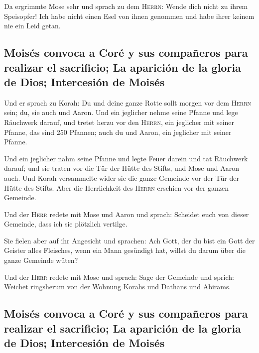  Da ergrimmte Mose sehr und sprach zu dem \textsc{Herrn}:
Wende dich nicht zu ihrem Speisopfer! Ich habe nicht einen Esel von
ihnen genommen und habe ihrer keinem nie ein Leid getan.

\hypertarget{moisuxe9s-convoca-a-coruxe9-y-sus-compauxf1eros-para-realizar-el-sacrificio-la-apariciuxf3n-de-la-gloria-de-dios-intercesiuxf3n-de-moisuxe9s}{%
\subsection{Moisés convoca a Coré y sus compañeros para realizar el
sacrificio; La aparición de la gloria de Dios; Intercesión de
Moisés}\label{moisuxe9s-convoca-a-coruxe9-y-sus-compauxf1eros-para-realizar-el-sacrificio-la-apariciuxf3n-de-la-gloria-de-dios-intercesiuxf3n-de-moisuxe9s}}

 Und er sprach zu Korah: Du und deine ganze Rotte sollt
morgen vor dem \textsc{Herrn} sein; du, sie auch und Aaron.
 Und ein jeglicher nehme seine Pfanne und lege Räuchwerk
darauf, und tretet herzu vor den \textsc{Herrn}, ein jeglicher mit
seiner Pfanne, das sind 250 Pfannen; auch du und Aaron, ein jeglicher
mit seiner Pfanne.

 Und ein jeglicher nahm seine Pfanne und legte Feuer
darein und tat Räuchwerk darauf; und sie traten vor die Tür der Hütte
des Stifts, und Mose und Aaron auch.  Und Korah
versammelte wider sie die ganze Gemeinde vor der Tür der Hütte des
Stifts. Aber die Herrlichkeit des \textsc{Herrn} erschien vor der ganzen
Gemeinde.

 Und der \textsc{Herr} redete mit Mose und Aaron und
sprach:  Scheidet euch von dieser Gemeinde, dass ich sie
plötzlich vertilge.

 Sie fielen aber auf ihr Angesicht und sprachen: Ach
Gott, der du bist ein Gott der Geister alles Fleisches, wenn ein Mann
gesündigt hat, willst du darum über die ganze Gemeinde wüten?

 Und der \textsc{Herr} redete mit Mose und sprach:
 Sage der Gemeinde und sprich: Weichet ringsherum von der
Wohnung Korahs und Dathans und Abirams.

\hypertarget{moisuxe9s-convoca-a-coruxe9-y-sus-compauxf1eros-para-realizar-el-sacrificio-la-apariciuxf3n-de-la-gloria-de-dios-intercesiuxf3n-de-moisuxe9s-1}{%
\subsection{Moisés convoca a Coré y sus compañeros para realizar el
sacrificio; La aparición de la gloria de Dios; Intercesión de
Moisés}\label{moisuxe9s-convoca-a-coruxe9-y-sus-compauxf1eros-para-realizar-el-sacrificio-la-apariciuxf3n-de-la-gloria-de-dios-intercesiuxf3n-de-moisuxe9s-1}}

